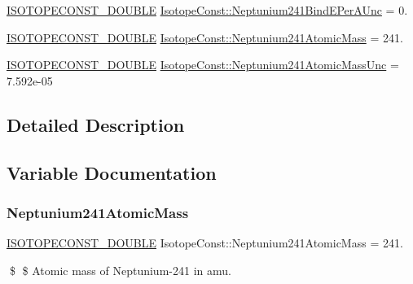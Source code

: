 \begin{DoxyCompactItemize}
\mbox{\hyperlink{group___isotope_const-_macros_ga8f45a7272ce02c0b4c65c44636ed719a}{I\+S\+O\+T\+O\+P\+E\+C\+O\+N\+S\+T\+\_\+\+D\+O\+U\+B\+LE}} \mbox{\hyperlink{group___isotope_const-_neptunium-_np241_ga43c806f473205780c7476192085a0c6c}{Isotope\+Const\+::\+Neptunium241\+Bind\+E\+Per\+A\+Unc}} = 0.
\item 
\mbox{\hyperlink{group___isotope_const-_macros_ga8f45a7272ce02c0b4c65c44636ed719a}{I\+S\+O\+T\+O\+P\+E\+C\+O\+N\+S\+T\+\_\+\+D\+O\+U\+B\+LE}} \mbox{\hyperlink{group___isotope_const-_neptunium-_np241_ga542f9478ee881af3f5acd7c4ff7a342d}{Isotope\+Const\+::\+Neptunium241\+Atomic\+Mass}} = 241.
\item 
\mbox{\hyperlink{group___isotope_const-_macros_ga8f45a7272ce02c0b4c65c44636ed719a}{I\+S\+O\+T\+O\+P\+E\+C\+O\+N\+S\+T\+\_\+\+D\+O\+U\+B\+LE}} \mbox{\hyperlink{group___isotope_const-_neptunium-_np241_ga5db58e0acd9975de60f6fbca0a7c7845}{Isotope\+Const\+::\+Neptunium241\+Atomic\+Mass\+Unc}} = 7.\+592e-\/05
\end{DoxyCompactItemize}


\subsection{Detailed Description}


\subsection{Variable Documentation}
\mbox{\label{group___isotope_const-_neptunium-_np241_ga542f9478ee881af3f5acd7c4ff7a342d}} 
\subsubsection{\texorpdfstring{Neptunium241\+Atomic\+Mass}{Neptunium241AtomicMass}}
{\footnotesize\ttfamily \mbox{\hyperlink{group___isotope_const-_macros_ga8f45a7272ce02c0b4c65c44636ed719a}{I\+S\+O\+T\+O\+P\+E\+C\+O\+N\+S\+T\+\_\+\+D\+O\+U\+B\+LE}} Isotope\+Const\+::\+Neptunium241\+Atomic\+Mass = 241.}

\$ \$ Atomic mass of Neptunium-\/241 in amu. \mbox{\label{group___isotope_const-_neptunium-_np241_ga5db58e0acd9975de60f6fbca0a7c7845}} 
